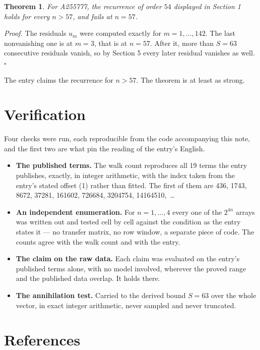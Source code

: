 \documentclass[11pt]{article}
\newtheorem{theorem}{Theorem}
\theoremstyle{definition}
\begin{document}
\begin{theorem} For A255777, the recurrence of order $54$ displayed in Section 1 holds for every $n > 57$, and fails at $n = 57$.\end{theorem}

{\itshape Proof.} The residuals $u_m$ were computed exactly for $m = 1,\dots,142$. The last nonvanishing one is at $m = 3$, that is at $n = 57$. After it, more than $S = 63$ consecutive residuals vanish, so by Section 5 every later residual vanishes as well. $\square$

The entry claims the recurrence for $n > 57$. The theorem is at least as strong.

\section{Verification}

Four checks were run, each reproducible from the code accompanying this note, and the first two are what pin the reading of the entry's English.

\begin{itemize}

\item {\bfseries The published terms.} The walk count reproduces all 19 terms the entry publishes, exactly, in integer arithmetic, with the index taken from the entry's stated offset (1) rather than fitted. The first of them are 436, 1743, 8672, 37281, 161602, 726684, 3204754, 14164510,~\dots

\item {\bfseries An independent enumeration.} For $n = 1,\dots,4$ every one of the $2^{4n}$ arrays was written out and tested cell by cell against the condition as the entry states it --- no transfer matrix, no row window, a separate piece of code. The counts agree with the walk count and with the entry.

\item {\bfseries The claim on the raw data.} Each claim was evaluated on the entry's published terms alone, with no model involved, wherever the proved range and the published data overlap. It holds there.

\item {\bfseries The annihilation test.} Carried to the derived bound $S = 63$ over the whole vector, in exact integer arithmetic, never sampled and never truncated.

\end{itemize}

\section{References}
\end{document}
